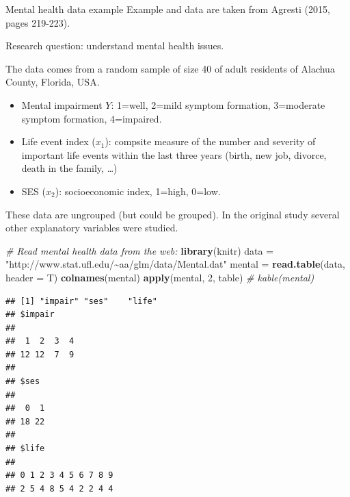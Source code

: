 \documentclass[
  ignorenonframetext,
]{beamer}
\newenvironment{Shaded}{\begin{snugshade}}{\end{snugshade}}
\newcommand{\AttributeTok}[1]{\textcolor[rgb]{0.13,0.29,0.53}{#1}}
\newcommand{\CommentTok}[1]{\textcolor[rgb]{0.56,0.35,0.01}{\textit{#1}}}
\newcommand{\DecValTok}[1]{\textcolor[rgb]{0.00,0.00,0.81}{#1}}
\newcommand{\FunctionTok}[1]{\textcolor[rgb]{0.13,0.29,0.53}{\textbf{#1}}}
\newcommand{\NormalTok}[1]{#1}
\newcommand{\OtherTok}[1]{\textcolor[rgb]{0.56,0.35,0.01}{#1}}
\newcommand{\StringTok}[1]{\textcolor[rgb]{0.31,0.60,0.02}{#1}}
\providecommand{\tightlist}{%
  \setlength{\itemsep}{0pt}\setlength{\parskip}{0pt}}
\begin{document}
\begin{frame}
\begin{block}{Mental health data example}
\label{mental-health-data-example}
Example and data are taken from Agresti (2015, pages 219-223).

Research question: understand mental health issues.

The data comes from a random sample of size 40 of adult residents of
Alachua County, Florida, USA.

\begin{itemize}
\tightlist
\item
  Mental impairment \(Y\): 1=well, 2=mild symptom formation, 3=moderate
  symptom formation, 4=impaired.
\item
  Life event index (\(x_1\)): compsite measure of the number and
  severity of important life events within the last three years (birth,
  new job, divorce, death in the family, \ldots)
\item
  SES (\(x_2\)): socioeconomic index, 1=high, 0=low.
\end{itemize}

These data are ungrouped (but could be grouped). In the original study
several other explanatory variables were studied.
\end{block}
\end{frame}

\begin{frame}[fragile]
\begin{Shaded}
\begin{Highlighting}[]
\CommentTok{\# Read mental health data from the web:}
\FunctionTok{library}\NormalTok{(knitr)}
\NormalTok{data }\OtherTok{=} \StringTok{"http://www.stat.ufl.edu/\textasciitilde{}aa/glm/data/Mental.dat"}
\NormalTok{mental }\OtherTok{=} \FunctionTok{read.table}\NormalTok{(data, }\AttributeTok{header =}\NormalTok{ T)}
\FunctionTok{colnames}\NormalTok{(mental)}
\FunctionTok{apply}\NormalTok{(mental, }\DecValTok{2}\NormalTok{, table)}
\CommentTok{\# kable(mental)}
\end{Highlighting}
\end{Shaded}

\begin{verbatim}
## [1] "impair" "ses"    "life"  
## $impair
## 
##  1  2  3  4 
## 12 12  7  9 
## 
## $ses
## 
##  0  1 
## 18 22 
## 
## $life
## 
## 0 1 2 3 4 5 6 7 8 9 
## 2 5 4 8 5 4 2 2 4 4
\end{verbatim}
\end{frame}
\end{document}

